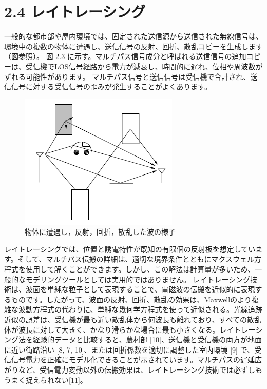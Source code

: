 \documentclass[dvipdfmx]{jsarticle}
\begin{document}
\section*{2.4 レイトレーシング}
一般的な都市部や屋内環境では、固定された送信源から送信された無線信号は、環境中の複数の物体に遭遇し、送信信号の反射、回折、散乱コピーを生成します（図参照）。
図 2.3 に示す。マルチパス信号成分と呼ばれる送信信号の追加コピーは、受信機でLOS信号経路から電力が減衰し、時間的に遅れ、位相や周波数がずれる可能性があります。
マルチパス信号と送信信号は受信機で合計され、送信信号に対する受信信号の歪みが発生することがよくあります。

\begin{figure}[htbp]
\begin{center}
\includegraphics[]{spring_lec/wc_ray.png}
\end{center}
\caption{物体に遭遇し，反射，回折，散乱した波の様子}
\end{figure}

レイトレーシングでは、位置と誘電特性が既知の有限個の反射板を想定しています。そして、マルチパス伝搬の詳細は、適切な境界条件とともにマクスウェル方程式を使用して解くことができます。しかし、この解法は計算量が多いため、一般的なモデリングツールとしては実用的ではありません。
レイトレーシング技術は、波面を単純な粒子として表現することで、電磁波の伝搬を近似的に表現するものです。したがって、波面の反射、回折、散乱の効果は、Maxwellのより複雑な波動方程式の代わりに、単純な幾何学方程式を使って近似される。光線追跡近似の誤差は、受信機が最も近い散乱体から何波長も離れており、すべての散乱体が波長に対して大きく、かなり滑らかな場合に最も小さくなる。レイトレーシング法を経験的データと比較すると、農村部 [10]、送信機と受信機の両方が地面に近い街路沿い [8, 7, 10]、または回折係数を適切に調整した室内環境 [9] で、受信信号電力を正確にモデル化できることが示されています。マルチパスの遅延広がりなど、受信電力変動以外の伝搬効果は、レイトレーシング技術では必ずしもうまく捉えられない[11]。
\end{document}
